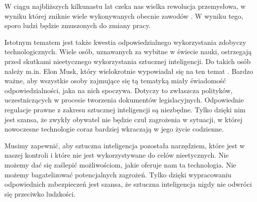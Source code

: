 W ciągu najbliższych kilkunastu lat czeka nas wielka rewolucja przemysłowa, w wyniku której zniknie wiele wykonywanych obecnie zawodów \cite{czwartaRewolucja:artykul}. W wyniku tego, sporo ludzi będzie zmuszonych do zmiany pracy.

Istotnym tematem jest także kwestia odpowiedzialnego wykorzystania zdobyczy technologicznych. Wiele osób, uznawanych za wybitne w świecie nauki, ostrzegają przed skutkami nieetycznego wykorzystania sztucznej inteligencji. Do takich osób należy m.in. Elon Musk, który wielokrotnie wypowiadał się na ten temat \cite{elonMusk:sztucznaInteligencja}. Bardzo ważne, aby wszystkie osoby zajmujące się tą tematyką miały świadomość odpowiedzialności, jaka na nich spoczywa. Dotyczy to zwłaszcza polityków, uczestniczących w procesie tworzenia dokumentów legislacyjnych. Odpowiednie regulacje prawne z zakresu sztucznej inteligencji są niezbędne. Tylko dzięki nim jest szansa, że zwykły obywatel nie będzie czuł zagrożenia w sytuacji, w której nowoczesne technologie coraz bardziej wkraczają w jego życie codzienne.

Musimy zapewnić, aby sztuczna inteligencja pozostała narzędziem, które jest w naszej kontroli i które nie jest wykorzystywane do celów nieetycznych. Nie możemy dać się zaślepić możliwościom, jakie oferuje nam ta technologia. Nie możemy bagatelizować potencjalnych zagrożeń. Tylko dzięki wypracowaniu odpowiednich zabezpieczeń jest szansa, że sztuczna inteligencja nigdy nie odwróci się przeciwko ludzkości.

\listoffigures